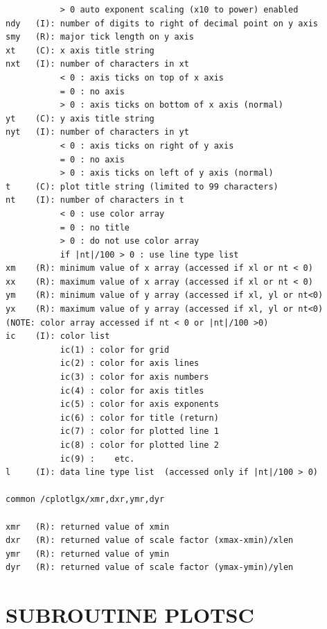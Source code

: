 \documentclass[11pt]{report}
\begin{document}
\begin{verbatim}
           > 0 auto exponent scaling (x10 to power) enabled
ndy   (I): number of digits to right of decimal point on y axis
smy   (R): major tick length on y axis
xt    (C): x axis title string
nxt   (I): number of characters in xt
           < 0 : axis ticks on top of x axis
           = 0 : no axis
           > 0 : axis ticks on bottom of x axis (normal)
yt    (C): y axis title string
nyt   (I): number of characters in yt
           < 0 : axis ticks on right of y axis
           = 0 : no axis
           > 0 : axis ticks on left of y axis (normal)
t     (C): plot title string (limited to 99 characters)
nt    (I): number of characters in t
           < 0 : use color array
           = 0 : no title
           > 0 : do not use color array
           if |nt|/100 > 0 : use line type list
xm    (R): minimum value of x array (accessed if xl or nt < 0)
xx    (R): maximum value of x array (accessed if xl or nt < 0)
ym    (R): minimum value of y array (accessed if xl, yl or nt<0)
yx    (R): maximum value of y array (accessed if xl, yl or nt<0)
(NOTE: color array accessed if nt < 0 or |nt|/100 >0)
ic    (I): color list
           ic(1) : color for grid
           ic(2) : color for axis lines
           ic(3) : color for axis numbers
           ic(4) : color for axis titles
           ic(5) : color for axis exponents
           ic(6) : color for title (return)
           ic(7) : color for plotted line 1
           ic(8) : color for plotted line 2
           ic(9) :    etc.
l     (I): data line type list  (accessed only if |nt|/100 > 0)

common /cplotlgx/xmr,dxr,ymr,dyr

xmr   (R): returned value of xmin
dxr   (R): returned value of scale factor (xmax-xmin)/xlen
ymr   (R): returned value of ymin
dyr   (R): returned value of scale factor (ymax-ymin)/ylen
\end{verbatim}


\newpage
\section{SUBROUTINE PLOTSC}
\end{document}
